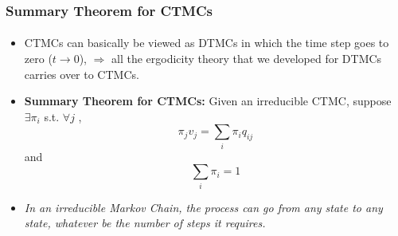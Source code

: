 \documentclass{beamer}
\begin{document}
\begin{frame} 
\frametitle{ Summary Theorem for CTMCs}
\framesubtitle{\textbf{\textit{}}}
\begin{itemize}

\item  CTMCs can basically be viewed as DTMCs in which the time step goes to
zero ($t \rightarrow 0$),  
$\Rightarrow $  all the ergodicity theory that we developed for DTMCs carries over to CTMCs.

\item \textbf{Summary Theorem for CTMCs:} Given an irreducible CTMC,
suppose $ \exists \pi_i $ s.t. $\forall j$ ,
$$\pi_j v_j = \sum_i \pi_i q_{ij}$$ and 
$$\sum_i \pi_i = 1$$

\item \textit{In an irreducible Markov Chain, the process can go from any state to any state, whatever be the number of steps it requires.}

\end{itemize}
\end{frame}
\end{document}
